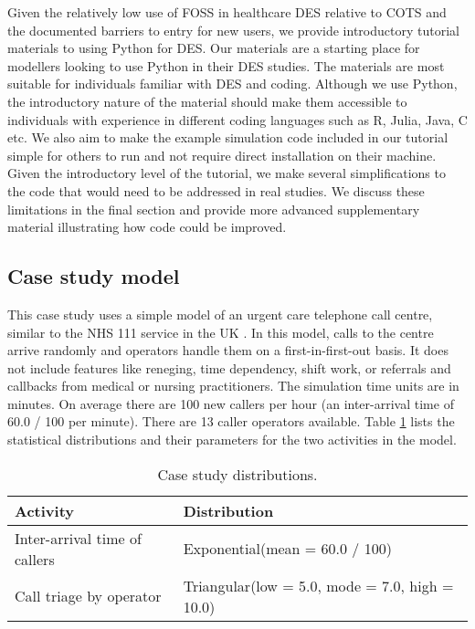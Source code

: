 \documentclass{swpaperproc}
\theoremstyle{sw}
\begin{document}
Given the relatively low use of FOSS in healthcare DES relative to COTS \cite{monks_harper_2023} and the documented barriers to entry for new users, we provide introductory tutorial materials to using Python for DES.  Our materials are a starting place for modellers looking to use Python in their DES studies. The materials are most suitable for individuals familiar with DES and coding.  Although we use Python, the introductory nature of the material should make them accessible to individuals with experience in different coding languages such as R, Julia, Java, C etc.  We also aim to make the example simulation code included in our tutorial simple for others to run and not require direct installation on their machine.  Given the introductory level of the tutorial, we make several simplifications to the code that would need to be addressed in real studies. We discuss these limitations in the final section and provide more advanced supplementary material illustrating how code could be improved.

\subsection{Case study model}

This case study uses a simple model of an urgent care telephone call centre, similar to the NHS 111 service in the UK \cite{NHS111}.  In this model, calls to the centre arrive randomly and operators handle them on a first-in-first-out basis. It does not include features like reneging, time dependency, shift work, or referrals and callbacks from medical or nursing practitioners.  The simulation time units are in minutes.  On average there are 100 new callers per hour (an inter-arrival time of 60.0 / 100 per minute). There are 13 caller operators available. Table \ref{tab: params} lists the statistical distributions and their parameters for the two activities in the model.  
 
\begin{table}[h]

\centering
\caption{Case study distributions.\label{tab: params}}
\begin{tabular}{|l|l|}
\hline
\textbf{Activity}             & \textbf{Distribution}                          \\ \hline
Inter-arrival time of callers & Exponential(mean = 60.0 / 100)                 \\ \hline
Call triage by operator       & Triangular(low = 5.0, mode = 7.0, high = 10.0) \\ \hline
\end{tabular}
\end{table}
\end{document}
